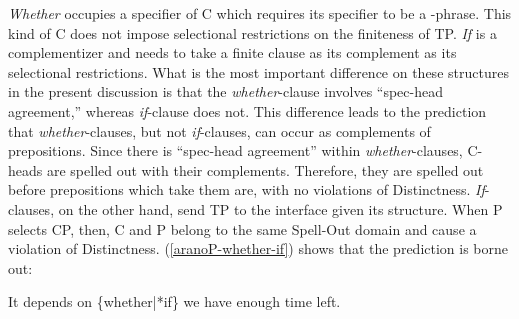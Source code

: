 \documentclass[output=paper]{langscibook}
\begin{document}
\emph{Whether} occupies a specifier of C which requires its specifier to be a \wh-phrase. This kind of C does not impose selectional restrictions on the finiteness of TP. \emph{If} is a complementizer and needs to take a finite clause as its complement as its selectional restrictions. What is the most important difference on these structures in the present discussion is that the \emph{whether}-clause involves ``spec-head agreement,'' whereas \emph{if}-clause does not. This difference leads to the prediction that  \emph{whether}-clauses, but not \emph{if}-clauses, can occur as complements of prepositions. Since there is ``spec-head agreement'' within \emph{whether}-clauses, C-heads are spelled out with their complements. Therefore, they are spelled out before prepositions which take them are, with no violations of Distinctness. \emph{If}-clauses, on the other hand, send TP to the interface given its structure. When P selects CP, then, C and P belong to the same Spell-Out domain and cause a violation of Distinctness. (\ref{aranoP-whether-if}) shows that the prediction is borne out:

\ea 
It depends on \textup{\{}whether\textup{|*}if\textup{\}} we have enough time left.
\\ \upshape \citep[974]{Huddleston2002The-Cambridge-G} \label{aranoP-whether-if}
\z 
\end{document}
